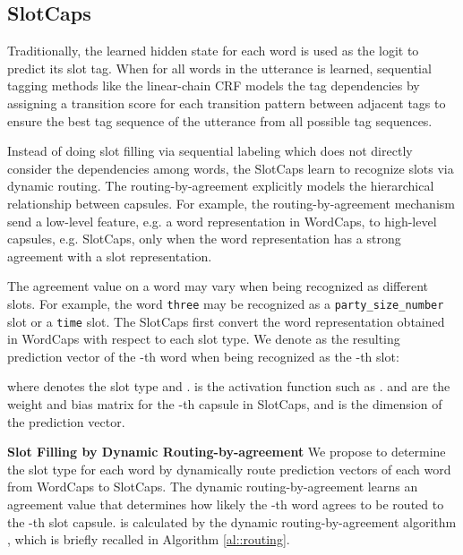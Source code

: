 \documentclass[11pt,a4paper,hyphens]{article}
\newcommand{\FirstCapsule}{WordCaps}
\newcommand{\SecondCapsule}{SlotCaps}
\begin{document}
\subsection{\SecondCapsule}
Traditionally, the learned hidden state  for each word  is used as the logit to predict its slot tag. When  for all words in the utterance is learned, sequential tagging methods like the linear-chain CRF models the tag dependencies by assigning a transition score for each transition pattern between adjacent tags to ensure the best tag sequence of the utterance from all possible tag sequences.

Instead of doing slot filling via sequential labeling which does not directly consider the dependencies among words, the {\SecondCapsule} learn to recognize slots via dynamic routing. The routing-by-agreement explicitly models the hierarchical relationship between capsules. For example, the routing-by-agreement mechanism send a low-level feature, e.g. a word representation in {\FirstCapsule}, to high-level capsules, e.g. {\SecondCapsule}, only when the word representation has a strong agreement with a slot representation.

The agreement value on a word may vary when being recognized as different slots. For example, the word \texttt{three} may be recognized as a \texttt{party\_size\_number} slot or a \texttt{time} slot.  The {\SecondCapsule} first convert the word representation obtained in {\FirstCapsule} with respect to each slot type. We denote  as the resulting prediction vector of the -th word when being recognized as the -th slot:

where  denotes the slot type and .  is the activation function such as .  and  are the weight and bias matrix for the -th capsule in {\SecondCapsule}, and  is the dimension of the prediction vector.

\noindent\textbf{Slot Filling by Dynamic Routing-by-agreement}
We propose to determine the slot type for each word by dynamically route prediction vectors of each word from {\FirstCapsule} to {\SecondCapsule}.
The dynamic routing-by-agreement learns an agreement value  that determines how likely the -th word agrees to be routed to the -th slot capsule.   is calculated by the dynamic routing-by-agreement algorithm \citep{sabour2017dynamic}, which is briefly recalled in Algorithm \ref{al::routing}.
\end{document}
